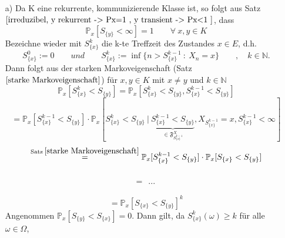 \mbox{}
\begin{itemize}
\item[a)] Da K eine rekurrente, kommunizierende Klasse ist, so folgt aus Satz $\ref{irreduzibel, y rekurrent -> Px=1 , y transient -> Px<1 }$, dass
\begin{equation*}
\mathbb{P}_{x}[S_{\lbrace y \rbrace} < \infty] = 1 \qquad \forall \: x,y \in K
\end{equation*}
Bezeichne wieder mit $S_{\lbrace x \rbrace}^{k}$ die k-te Treffzeit des Zustandes $x \in E$, d.h.
\begin{equation*}
S_{\lbrace x \rbrace}^{0} := 0 \qquad und \qquad S_{\lbrace x \rbrace}^{k} := \inf \lbrace n > S_{\lbrace x \rbrace}^{k-1} \: : \: X_{n} = x \rbrace \qquad , \quad k \in \mathbb{N}.
\end{equation*}
Dann folgt aus der starken Markoveigenschaft (Satz $\ref{starke Markoveigenschaft}$) für $x,y \in K$ mit $x \neq y$ und $k \in \mathbb{N}$
\begin{equation*}
\mathbb{P}_{x}[S_{\lbrace x \rbrace}^{k} < S_{\lbrace y \rbrace}] = \mathbb{P}_{x}[S_{\lbrace x \rbrace}^{k} < S_{\lbrace y \rbrace}, S_{\lbrace x \rbrace}^{k-1} < S_{\lbrace y \rbrace}]
\end{equation*}
\begin{equation*}
= \mathbb{P}_{x}[S_{\lbrace x \rbrace}^{k-1} < S_{\lbrace y \rbrace}]\cdot \mathbb{P}_{x}[S_{\lbrace x \rbrace}^{k} < S_{\lbrace y \rbrace} \: | \: \underbrace{S_{\lbrace x \rbrace}^{k-1} < S_{\lbrace y \rbrace}}_{\in \mathfrak{F}_{S_{\lbrace x \rbrace}^{k-1}}^{X}}, X_{S_{\lbrace x \rbrace}^{k-1}} = x, S_{\lbrace x \rbrace}^{k-1}< \infty]
\end{equation*}
\begin{equation*}
\stackrel{\mathrm{Satz} \: \ref{starke Markoveigenschaft}}{=} \mathbb{P}_{x}[S_{\lbrace x \rbrace}^{k-1} < S_{\lbrace y \rbrace}] \cdot \mathbb{P}_{x}[S_{\lbrace x \rbrace} < S_{\lbrace y \rbrace}]
\end{equation*}
\\
\begin{equation*}
= \: \: ... \: \:
\end{equation*}
\\
\begin{equation*}
= \mathbb{P}_{x}[S_{\lbrace x \rbrace} < S_{\lbrace y \rbrace}]^{k}
\end{equation*}
Angenommen $\mathbb{P}_{x}[S_{\lbrace y \rbrace} < S_{\lbrace x \rbrace}]=0$. Dann gilt, da $S_{\lbrace x \rbrace}^{k}(\omega) \geq k$ für alle $\omega \in \Omega$, 

\end{itemize}
